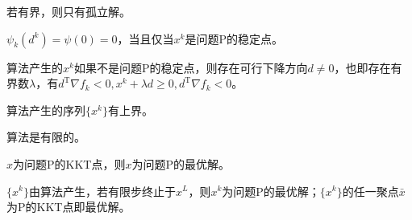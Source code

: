             若有界，则只有孤立解。
            \begin{lemma}
            ${\psi}_k(d^k)=\psi(0)=0$，当且仅当$x^k$是问题P的稳定点。
            \end{lemma}
            \begin{lemma}
            算法产生的$x^k$如果不是问题P的稳定点，则存在可行下降方向$d\neq 0$，也即存在有界数$\lambda$，有$d^\mathrm{T} \nabla f_k<0,x^k+\lambda d\geqslant 0,d^\mathrm{T} \nabla f_k<0$。
            \end{lemma}
            \begin{lemma}
            算法产生的序列$\{x^k\}$有上界。
            \end{lemma}
            \begin{theorem}
            算法是有限的。
            \end{theorem}
            \begin{theorem}
            $x$为问题P的KKT点，则$x$为问题P的最优解。
            \end{theorem}
            \begin{theorem}
            $\{x^k\}$由算法产生，若有限步终止于$x^L$，则$x^k$为问题P的最优解；$\{x^k\}$的任一聚点$\bar{x}$为P的KKT点即最优解。
            \end{theorem}

